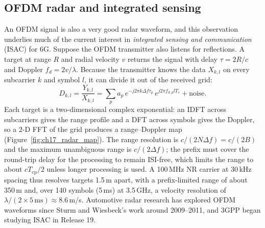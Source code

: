 
\subsection{OFDM radar and integrated sensing}

An OFDM signal is also a very good radar waveform, and this observation underlies much of the current interest
in \emph{integrated sensing and communication} (ISAC) for 6G. Suppose the OFDM transmitter also listens for
reflections. A target at range $R$ and radial velocity $v$ returns the signal with delay $\tau=2R/c$ and Doppler
$f_d=2v/\lambda$. Because the transmitter knows the data $X_{k,l}$ on every subcarrier $k$ and symbol $l$, it can
divide it out of the received grid:
\begin{equation}
D_{k,l}=\frac{Y_{k,l}}{X_{k,l}}=\sum_pa_p\,e^{-j2\pi k\Delta f\tau_p}\,e^{j2\pi f_{d,p}lT_s}+\text{noise}.
\end{equation}
Each target is a two-dimensional complex exponential: an IDFT across subcarriers gives the range profile and a
DFT across symbols gives the Doppler, so a 2-D FFT of the grid produces a range--Doppler map
(Figure~\ref{fig:ch17_radar_map}). The range resolution is $c/(2N\Delta f)=c/(2B)$ and the maximum unambiguous
range is $c/(2\Delta f)$; the prefix must cover the round-trip delay for the processing to remain ISI-free, which
limits the range to about $cT_{\text{cp}}/2$ unless longer processing is used. A 100\,MHz NR carrier at 30\,kHz
spacing thus resolves targets 1.5\,m apart, with a prefix-limited range of about 350\,m and, over 140 symbols
(5\,ms) at 3.5\,GHz, a velocity resolution of $\lambda/(2\times5\,\text{ms})\approx8.6$\,m/s. Automotive radar
research has explored OFDM waveforms since Sturm and Wiesbeck's work around 2009--2011, and 3GPP began studying
ISAC in Release 19.


